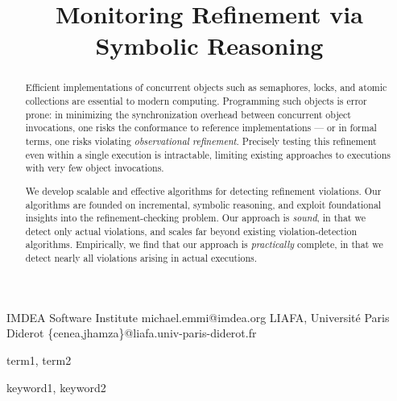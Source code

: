 \documentclass{sigplanconf}
\begin{document}
  \setlength{\pdfpageheight}{\paperheight}
  \setlength{\pdfpagewidth}{\paperwidth}


  \title{Monitoring Refinement via Symbolic Reasoning}

    {IMDEA Software Institute}
    {michael.emmi@imdea.org}
    {LIAFA, Université Paris Diderot}
    {\{cenea,jhamza\}@liafa.univ-paris-diderot.fr}

  \maketitle

  \begin{abstract}

    Efficient implementations of concurrent objects such as semaphores, locks,
    and atomic collections are essential to modern computing. Programming such
    objects is error prone: in minimizing the synchronization overhead between
    concurrent object invocations, one risks the conformance to reference
    implementations --- or in formal terms, one risks violating
    \emph{observational refinement}. Precisely testing this refinement even
    within a single execution is intractable, limiting existing approaches to
    executions with very few object invocations.

    We develop scalable and effective algorithms for detecting refinement
    violations. Our algorithms are founded on incremental, symbolic reasoning,
    and exploit foundational insights into the refinement-checking problem. Our
    approach is \emph{sound}, in that we detect only actual violations, and
    scales far beyond existing violation-detection algorithms. Empirically, we
    find that our approach is \emph{practically} complete, in that we detect
    nearly all violations arising in actual executions.

  \end{abstract}
  

  \terms
  term1, term2

  \keywords
  keyword1, keyword2

  
  
  
  
  
  
  
  
  
  
\end{document}
